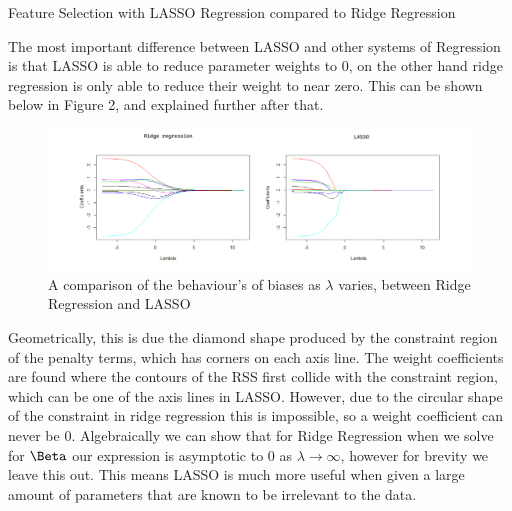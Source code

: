 \documentclass[final]{beamer}
\newlength{\onecolwid}
\begin{document}
\begin{frame}[t]
\begin{columns}[t]
\begin{column}{\onecolwid}
\begin{block}{Feature Selection with LASSO Regression compared to Ridge Regression}
    \footnotesize{The most important difference between LASSO and other systems of Regression is that LASSO is able to reduce parameter weights to 0, on the other hand ridge regression is only able to reduce their weight to near zero. This can be shown below in Figure 2, and explained further after that.
    \begin{figure}
        \centering
        \includegraphics[width=1\linewidth]{Ridge VS LASSO.png}
        \caption{\; A comparison of the behaviour's of biases as $\lambda$ varies, between Ridge Regression and LASSO}
    \end{figure}        
Geometrically, this is due the diamond shape produced by the constraint region of the penalty terms, which has corners on each axis line. The weight coefficients are found where the contours of the RSS first collide with the constraint region, which can be one of the axis lines in LASSO. However, due to the circular shape of the constraint in ridge regression this is impossible, so a weight coefficient can never be 0. Algebraically we can show that for Ridge Regression when we solve for $\Beta$ our expression is asymptotic to $0$ as $\lambda \rightarrow \infty$, however for brevity we leave this out. This means LASSO is much more useful when given a large amount of parameters that are known to be irrelevant to the data.

}
\end{block}
\end{column}
\end{columns}
\end{frame}
\end{document}
